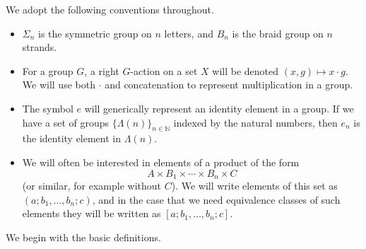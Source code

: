 \documentclass{amsbook} %
\newcommand{\N}{\mathbb{N}}
\numberwithin{section}{chapter}
\begin{document}
\begin{conv}
We adopt the following conventions throughout.
\begin{itemize}
\item $\Sigma_{n}$ is the symmetric group on $n$ letters, and $B_{n}$ is the braid group on $n$ strands.
\item For a group $G$, a right $G$-action on a set $X$ will be denoted $(x,g) \mapsto x \cdot g$.  We will use both $\cdot$ and concatenation to represent multiplication in a group.
\item The symbol $e$ will generically represent an identity element in a group.  If we have a set of groups $\{ \Lambda(n) \}_{n \in \N}$ indexed by the natural numbers, then $e_{n}$ is the identity element in $\Lambda(n)$.
\item We will often be interested in elements of a product of the form
\[
A \times B_{1} \times \cdots \times B_{n} \times C
\]
(or similar, for example without $C$).  We will write elements of this set as $(a; b_{1}, \ldots, b_{n}; c)$, and in the case that we need equivalence classes of such elements they will be written as $[a; b_{1}, \ldots, b_{n}; c]$.
\end{itemize}
\end{conv}

We begin with the basic definitions.
\end{document}
